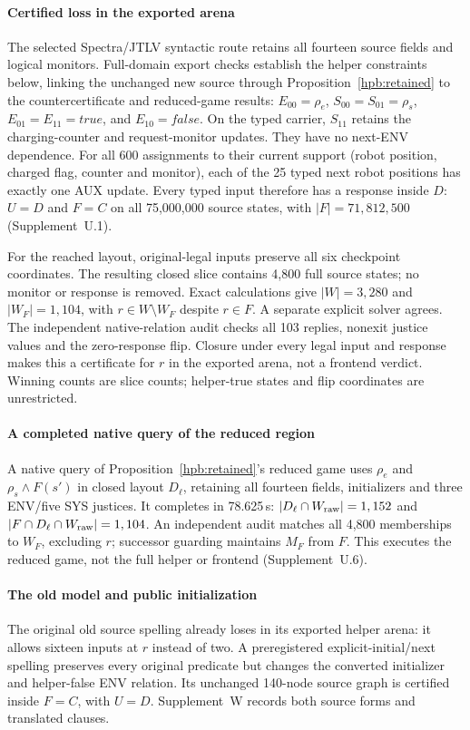 \paragraph{Certified loss in the exported arena}
The selected Spectra/JTLV syntactic route retains all fourteen source
fields and logical monitors. Full-domain export checks establish the
helper constraints below, linking the unchanged new source through
Proposition~\ref{hpb:retained} to the countercertificate and
reduced-game results:
$E_{00}=\rho_e$, $S_{00}=S_{01}=\rho_s$,
$E_{01}=E_{11}=\mathit{true}$, and $E_{10}=\mathit{false}$.
On the typed carrier, $S_{11}$ retains the charging-counter and
request-monitor updates. They have no next-ENV dependence. For all 600
assignments to their current support (robot position, charged flag,
counter and monitor), each of the 25 typed next robot positions has
exactly one AUX update. Every typed input therefore has a response
inside $D$: $U=D$ and $F=C$ on all 75,000,000 source states, with
$|F|=71,812,500$ (Supplement~U.1).

For the reached layout, original-legal inputs preserve all six checkpoint
coordinates. The resulting closed slice contains 4,800 full source states;
no monitor or response is removed. Exact calculations give
$|W|=3,280$ and $|W_F|=1,104$, with $r\in W\setminus W_F$ despite
$r\in F$. A separate explicit solver agrees. The independent native-relation audit
checks all 103 replies, nonexit justice values and the zero-response flip.
Closure under every legal input and response makes this a certificate
for $r$ in the exported arena, not a frontend verdict. Winning counts
are slice counts; helper-true states and flip coordinates are unrestricted.

\paragraph{A completed native query of the reduced region}
A native query of Proposition~\ref{hpb:retained}'s reduced game uses
$\rho_e$ and $\rho_s\land F(s')$ in closed layout $D_\ell$, retaining
all fourteen fields, initializers and three ENV/five SYS justices.
It completes in 78.625\,s: $|D_\ell\cap W_{\rm raw}|=1,152$ and
$|F\cap D_\ell\cap W_{\rm raw}|=1,104$. An independent audit matches
all 4,800 memberships to $W_F$, excluding $r$; successor guarding
maintains $M_F$ from $F$. This executes the reduced game, not the full
helper or frontend (Supplement~U.6).

\paragraph{The old model and public initialization}
The original old source spelling already loses in its exported helper
arena: it allows sixteen inputs at $r$ instead of two. A preregistered
explicit-initial/next spelling preserves every original predicate but
changes the converted initializer and helper-false ENV relation. Its
unchanged 140-node source graph is certified inside $F=C$, with $U=D$.
Supplement~W records both source forms and translated clauses.

